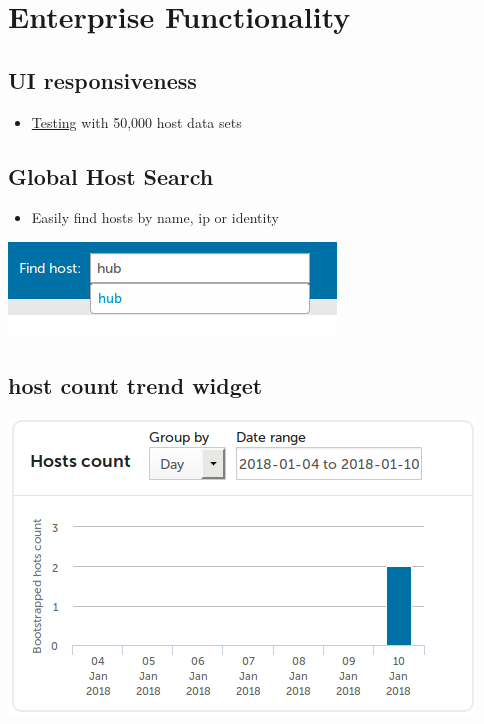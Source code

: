 \documentclass[11pt]{article}
\begin{document}
\section*{Enterprise Functionality}
\label{sec:orgfe44e59}
\subsection*{UI responsiveness}
\label{sec:org987f090}
\begin{itemize}
\item \href{data/75/971753-cddb-4739-a0a1-dcb66df44ab9/alert-status-speed-comparison.webm}{Testing} with 50,000 host data sets
\end{itemize}

\subsection*{Global Host Search}
\label{sec:org657be7b}
\begin{itemize}
\item Easily find hosts by name, ip or identity
\end{itemize}

\begin{center}
\includegraphics[width=.9\linewidth]{data/f9/7c9b4d-d46f-4aee-bd68-630f44106b0e/2018-01-14_Selection_002_2018-01-14_13-21-21.png}
\end{center}

\subsection*{host count trend widget}
\label{sec:orgc7512ff}
\begin{center}
\includegraphics[width=.9\linewidth]{data/e9/0e4df9-0bb7-4a1e-84d5-25911497f93c/2018-01-10_Selection_001_2018-01-14_12-02-44.png}
\end{center}
\end{document}
